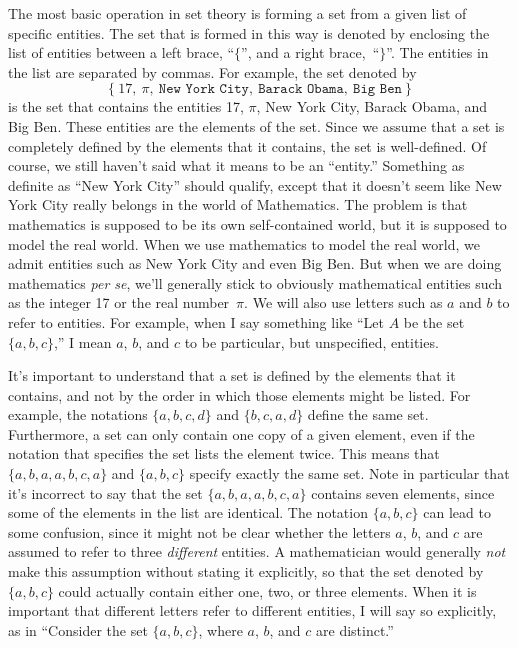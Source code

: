 The most basic operation in set theory is forming a set from a given
list of specific entities.  The set that is formed in this way is denoted
by enclosing the list of entities between  a left brace, ``$\{$'', and
a right brace,~``$\}$''.  The entities in the list are separated by
commas.  For example, the set denoted by
\[\{\ 17,\ \pi,\ \texttt{New York City},\ \texttt{Barack Obama},\ \texttt{Big Ben}\ \}\]
is the set that contains the entities 17, $\pi$, New York City, Barack Obama,
and Big Ben.  These entities are the elements of the set.  Since we assume
that a set is completely defined by the elements that it contains, the
set is well-defined.  Of course, we still haven't said what it means to
be an ``entity.''  Something as definite as ``New York City'' should qualify,
except that it doesn't seem like New York City really belongs in the world
of Mathematics.  The problem is that mathematics is supposed to be its own
self-contained world, but it is supposed to model the real world.  When we 
use mathematics to model the real world, we admit entities such as New
York City and even Big Ben.  But when we are doing mathematics {\it per se},
we'll generally stick to obviously mathematical entities such as the
integer 17 or the real number~$\pi$.  We will also use letters such
as $a$ and $b$ to refer to entities.  For example, when I say
something like ``Let $A$ be the set $\{a,b,c\}$,'' I mean $a$, $b$, and
$c$ to be particular, but unspecified, entities.

It's important to understand that a set is defined by the elements that
it contains, and not by the order in which those elements might be listed.
For example, the notations $\{a,b,c,d\}$ and $\{b,c,a,d\}$ define the same
set.   Furthermore, a set can only contain one copy of a given element,
even if the notation that specifies the set lists the element twice.
This means that $\{a,b,a,a,b,c,a\}$ and $\{a,b,c\}$ specify exactly the
same set.  Note in particular that it's incorrect to say that
the set $\{a,b,a,a,b,c,a\}$ contains seven elements, since some of the
elements in the list are identical.  The notation $\{a,b,c\}$ can lead
to some confusion, since it might not be clear whether the letters $a$,
$b$, and $c$ are assumed to refer to three \emph{different} entities.
A mathematician would generally \emph{not} make this assumption without
stating it explicitly, so that the set denoted by $\{a,b,c\}$ could
actually contain either one, two, or three elements.  When it is important
that different letters refer to different entities, I will say so explicitly,
as in ``Consider the set $\{a,b,c\}$, where $a$, $b$, and $c$ are distinct.''

